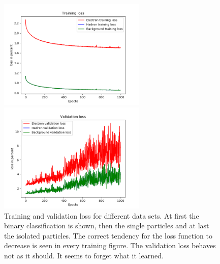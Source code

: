 \begin{figure}
\begin{minipage}{0.45\textwidth}
\end{minipage}
\\\begin{minipage}{0.45\textwidth}
\includegraphics[width=7cm]{trainlossisolated.png}
\end{minipage}
\begin{minipage}{0.45\textwidth}
\includegraphics[width=7cm]{vallossisolated.png}
\end{minipage}
\caption{Training and validation loss for different data sets. At first the binary classification is shown, then the single particles and at last the isolated particles. The correct tendency for the loss function to decrease is seen in every training figure. The validation loss behaves not as it should. It seems to forget what it learned.}
\end{figure}

